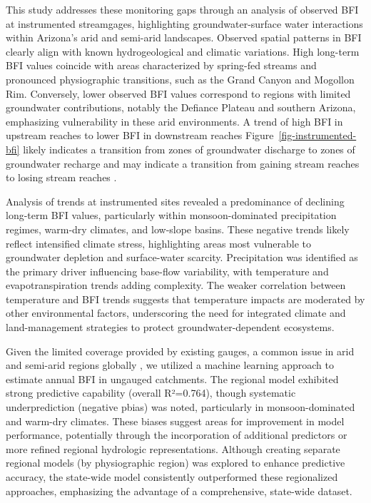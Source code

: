 \documentclass[
  authoryear,
  preprint,
  1p,
  onecolumn]{elsarticle}
\begin{document}
This study addresses these monitoring gaps through an analysis of
observed BFI at instrumented streamgages, highlighting
groundwater-surface water interactions within Arizona's arid and
semi-arid landscapes. Observed spatial patterns in BFI clearly align
with known hydrogeological and climatic variations. High long-term BFI
values coincide with areas characterized by spring-fed streams and
pronounced physiographic transitions, such as the Grand Canyon and
Mogollon Rim. Conversely, lower observed BFI values correspond to
regions with limited groundwater contributions, notably the Defiance
Plateau and southern Arizona, emphasizing vulnerability in these arid
environments. A trend of high BFI in upstream reaches to lower BFI in
downstream reaches Figure~\ref{fig-instrumented-bfi} likely indicates a
transition from zones of groundwater discharge to zones of groundwater
recharge and may indicate a transition from gaining stream reaches to
losing stream reaches \citep{winter2007}.

Analysis of trends at instrumented sites revealed a predominance of
declining long-term BFI values, particularly within monsoon-dominated
precipitation regimes, warm-dry climates, and low-slope basins. These
negative trends likely reflect intensified climate stress, highlighting
areas most vulnerable to groundwater depletion and surface-water
scarcity. Precipitation was identified as the primary driver influencing
base-flow variability, with temperature and evapotranspiration trends
adding complexity. The weaker correlation between temperature and BFI
trends suggests that temperature impacts are moderated by other
environmental factors, underscoring the need for integrated climate and
land-management strategies to protect groundwater-dependent ecosystems.

Given the limited coverage provided by existing gauges, a common issue
in arid and semi-arid regions globally \citep{krabbenhoft-2022}, we
utilized a machine learning approach to estimate annual BFI in ungauged
catchments. The regional model exhibited strong predictive capability
(overall R²=0.764), though systematic underprediction (negative pbias)
was noted, particularly in monsoon-dominated and warm-dry climates.
These biases suggest areas for improvement in model performance,
potentially through the incorporation of additional predictors or more
refined regional hydrologic representations. Although creating separate
regional models (by physiographic region) was explored to enhance
predictive accuracy, the state-wide model consistently outperformed
these regionalized approaches, emphasizing the advantage of a
comprehensive, state-wide dataset.
\end{document}
